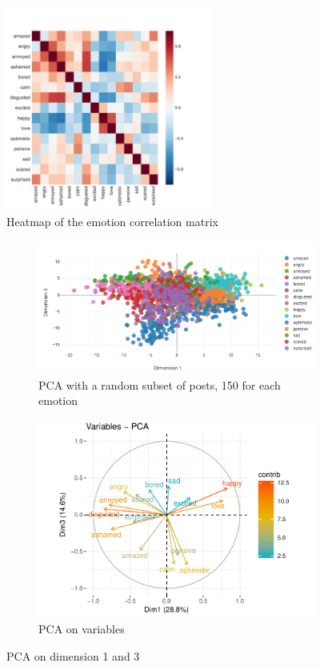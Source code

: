 \documentclass{article} %
\begin{document}
\begin{figure}[H]
    \centering
    \includegraphics[width=0.6\textwidth]{Images/correlation_matrix.pdf}
    \caption{Heatmap of the emotion correlation matrix}
    \label{appendix:heatmap}
\end{figure}
\begin{figure}[H]
    \begin{subfigure}[t]{.5\textwidth}
        \vskip 0pt %
        \centering
        \includegraphics[width=\linewidth]{Images/PCA_1vs3.png}
        \caption{PCA with a random subset of posts, 150 for each emotion}
   \end{subfigure}
   \begin{subfigure}[t]{.5\textwidth}
       \vskip 0pt
       \centering
       \includegraphics[width=\linewidth]{Images/variables_pca_1vs3.pdf}
       \caption{PCA on variables}
    \end{subfigure}
    \caption{PCA on dimension 1 and 3}
\end{figure}
\end{document}
